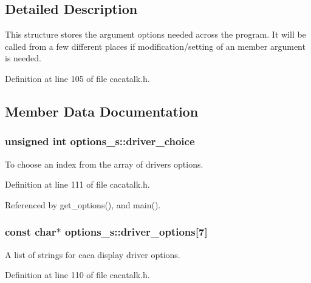 \subsection{\-Detailed \-Description}
\-This structure stores the argument options needed across the program. \-It will be called from a few different places if modification/setting of an member argument is needed. 

\-Definition at line 105 of file cacatalk.\-h.



\subsection{\-Member \-Data \-Documentation}
\hypertarget{structoptions__s_a23c963605bc84d66eedd18089502d8e4}{
\subsubsection[{driver\-\_\-choice}]{\setlength{\rightskip}{0pt plus 5cm}unsigned int {\bf options\-\_\-s\-::driver\-\_\-choice}}}\label{structoptions__s_a23c963605bc84d66eedd18089502d8e4}


\-To choose an index from the array of drivers options. 



\-Definition at line 111 of file cacatalk.\-h.



\-Referenced by get\-\_\-options(), and main().

\hypertarget{structoptions__s_a74d98a4b0f31c22e05993a1bdef76afc}{
\subsubsection[{driver\-\_\-options}]{\setlength{\rightskip}{0pt plus 5cm}const char$\ast$ {\bf options\-\_\-s\-::driver\-\_\-options}\mbox{[}7\mbox{]}}}\label{structoptions__s_a74d98a4b0f31c22e05993a1bdef76afc}


\-A list of strings for caca display driver options. 



\-Definition at line 110 of file cacatalk.\-h.



